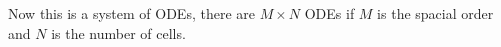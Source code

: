 \documentclass[11pt, oneside]{article}
\begin{document}
  Now this is a system of ODEs, there are $M \times N$ ODEs if $M$ is the spacial
  order and $N$ is the number of cells.
\end{document}
